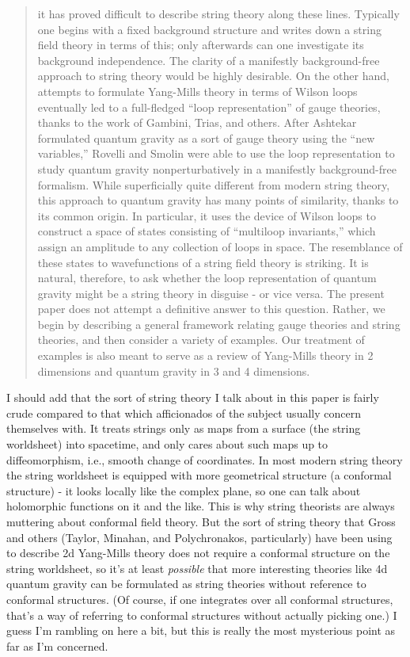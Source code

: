 \begin{quote}
it has proved difficult to describe string theory along these lines.
Typically one begins with a fixed background structure and writes down
a string field theory in terms of this; only afterwards can one
investigate its background independence.  The clarity of a manifestly
background-free approach to string theory would be highly desirable.  
On the other hand, attempts to formulate Yang-Mills theory in terms of
Wilson loops eventually led to a full-fledged ``loop representation'' of
gauge theories, thanks to the work of Gambini, Trias, and
others.   After Ashtekar formulated quantum gravity as a sort of gauge
theory using the ``new variables,''  Rovelli and Smolin were able to use
the loop representation to study quantum gravity nonperturbatively in a
manifestly background-free formalism.   While superficially
quite different from modern string theory, this approach to quantum gravity
has many points of similarity, thanks to its common origin.  In particular,
it uses the device of Wilson loops to construct a space of states
consisting of ``multiloop invariants,'' which assign an amplitude to any
collection of loops in space.  The resemblance of these states to
wavefunctions of a string field theory is striking.  It is natural,
therefore, to ask whether the loop representation of quantum gravity might
be a string theory in disguise - or vice versa.  
The present paper does not attempt a definitive answer to this question.
Rather, we begin by describing a general framework relating gauge theories and 
string theories, and then consider a variety of examples.  Our treatment of
examples is also meant to serve as a review of Yang-Mills theory in 2
dimensions and quantum gravity in 3 and 4 dimensions. 
\end{quote}
    

I should add that the sort of string theory I talk about in this paper
is fairly crude compared to that which afficionados of the subject
usually concern themselves with.  It treats strings only as maps from a
surface (the string worldsheet) into spacetime, and only cares about
such maps up to diffeomorphism, i.e., smooth change of coordinates.  In
most modern string theory the string worldsheet is equipped with more
geometrical structure (a conformal structure) - it looks locally like
the complex plane, so one can talk about holomorphic functions on it and
the like.  This is why string theorists are always muttering about
conformal field theory.  But the sort of string theory that Gross and others
(Taylor, Minahan, and Polychronakos, particularly) have been using to
describe 2d Yang-Mills theory does not require a conformal structure on
the string worldsheet, so it's at least \emph{possible} that more interesting
theories like 4d quantum gravity can be formulated as string theories
without reference to conformal structures.  (Of course, if one
integrates over all conformal structures, that's a way of referring to
conformal structures without actually picking one.)  I guess I'm
rambling on here a bit, but this is really the most mysterious point as
far as I'm concerned.  

